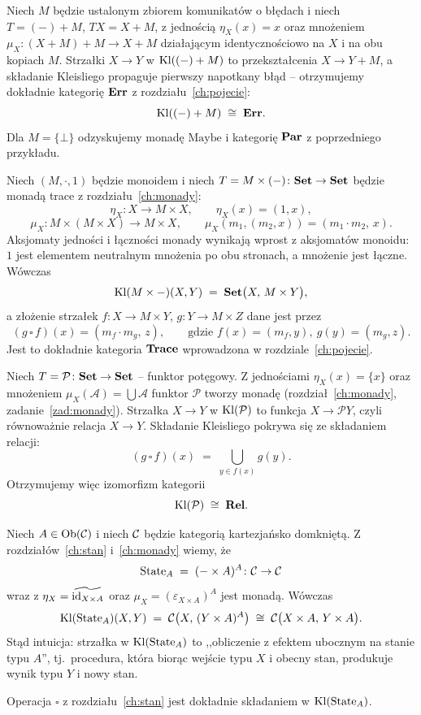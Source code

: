 \begin{przyklad}
Niech $M$ będzie ustalonym zbiorem komunikatów o błędach i niech $T = (-) + M$, $TX = X + M$, z jednością $\eta_X(x) = x$ oraz mnożeniem $\mu_X \colon (X+M)+M \to X+M$ działającym identycznościowo na $X$ i na obu kopiach $M$. Strzałki $X \to Y$ w $\mathrm{Kl}((-)+M)$ to przekształcenia $X \to Y + M$, a składanie Kleisliego propaguje pierwszy napotkany błąd -- otrzymujemy dokładnie kategorię $\mathbf{Err}$ z rozdziału~\ref{ch:pojecie}:
\[
\mathrm{Kl}((-)+M) \;\cong\; \mathbf{Err}.
\]
Dla $M = \{\bot\}$ odzyskujemy monadę $\mathrm{Maybe}$ i kategorię $\mathbf{Par}$ z poprzedniego przykładu.
\end{przyklad}

\begin{przyklad}
Niech $(M,\cdot,1)$ będzie monoidem i niech $T = M\times(-)\colon \mathbf{Set}\to\mathbf{Set}$ będzie monadą trace z rozdziału~\ref{ch:monady}:
\[
\eta_X\colon X\to M\times X, \qquad \eta_X(x) = (1,x),
\]
\[
\mu_X\colon M\times(M\times X)\to M\times X, \qquad \mu_X(m_1,(m_2,x)) = (m_1\cdot m_2,\, x).
\]
Aksjomaty jedności i łączności monady wynikają wprost z aksjomatów monoidu: $1$ jest elementem neutralnym mnożenia po obu stronach, a mnożenie jest łączne. Wówczas
\[
\mathrm{Kl}(M\times{-})(X,Y) \;=\; \mathbf{Set}\bigl(X,\, M\times Y\bigr),
\]
a złożenie strzałek $f\colon X\to M\times Y$, $g\colon Y\to M\times Z$ dane jest przez
\[
(g\,\square\, f)(x) = (m_f\cdot m_g,\, z), \qquad \text{gdzie } f(x)=(m_f,y),\ g(y)=(m_g,z).
\]
Jest to dokładnie kategoria $\mathbf{Trace}$ wprowadzona w rozdziale~\ref{ch:pojecie}.
\end{przyklad}

\begin{przyklad}
Niech $T = \mathcal{P}\colon \mathbf{Set}\to\mathbf{Set}$ -- funktor potęgowy. Z jednościami $\eta_X(x)=\{x\}$ oraz mnożeniem $\mu_X(\mathcal{A}) = \bigcup\mathcal{A}$ funktor $\mathcal{P}$ tworzy monadę (rozdział~\ref{ch:monady}, zadanie~\ref{zad:monady}). Strzałka $X\to Y$ w $\mathrm{Kl}(\mathcal{P})$ to funkcja $X\to \mathcal{P}Y$, czyli równoważnie relacja $X\to Y$. Składanie Kleisliego pokrywa się ze składaniem relacji:
\[
(g\,\square\, f)(x) \;=\; \bigcup_{y\in f(x)} g(y).
\]
Otrzymujemy więc izomorfizm kategorii
\[
\mathrm{Kl}(\mathcal{P}) \;\cong\; \mathbf{Rel}.
\]
\end{przyklad}

\begin{przyklad}
Niech $A\in\mathrm{Ob}(\mathcal{C})$ i niech $\mathcal{C}$ będzie kategorią kartezjańsko domkniętą. Z rozdziałów~\ref{ch:stan} i~\ref{ch:monady} wiemy, że
\[
\mathrm{State}_A \;=\; (-\times A)^A\colon \mathcal{C}\to\mathcal{C}
\]
wraz z $\eta_X = \widetilde{\mathrm{id}_{X\times A}}$ oraz $\mu_X = (\varepsilon_{X\times A})^A$ jest monadą. Wówczas
\[
\mathrm{Kl}(\mathrm{State}_A)(X,Y) \;=\; \mathcal{C}\bigl(X,\, (Y\times A)^A\bigr) \;\cong\; \mathcal{C}\bigl(X\times A,\, Y\times A\bigr).
\]
Stąd intuicja: strzałka w $\mathrm{Kl}(\mathrm{State}_A)$ to ,,obliczenie z efektem ubocznym na stanie typu $A$'', tj.\ procedura, która biorąc wejście typu $X$ i obecny stan, produkuje wynik typu $Y$ i nowy stan.

Operacja $\square$ z rozdziału~\ref{ch:stan} jest dokładnie składaniem w $\mathrm{Kl}(\mathrm{State}_A)$.
\end{przyklad}

